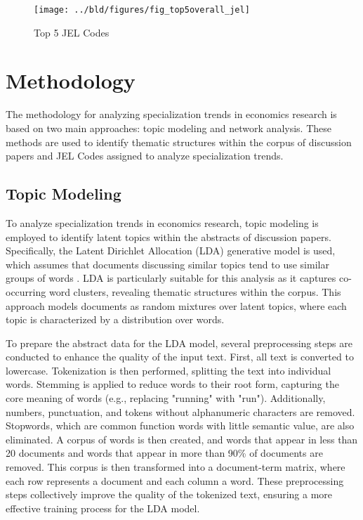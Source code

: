 \documentclass[11pt, a4paper, leqno]{article}
\begin{document}
\begin{figure}[htbp!]
    \centering
    \texttt{[image: ../bld/figures/fig\_top5overall\_jel]}
    \caption{Top 5 JEL Codes}
    \label{fig:top5overall_jel}
\end{figure}

\section{Methodology}
The methodology for analyzing specialization trends in economics research is based on two main approaches: topic modeling and network analysis.
These methods are used to identify thematic structures within the corpus of discussion papers and JEL Codes assigned to analyze specialization trends.

\subsection{Topic Modeling}
To analyze specialization trends in economics research, topic modeling is employed to identify latent topics within the abstracts of discussion papers.
Specifically, the Latent Dirichlet Allocation (LDA) generative model is used, which assumes that documents discussing similar topics tend to use similar groups of words \citep{blei2003}.
LDA is particularly suitable for this analysis as it captures co-occurring word clusters, revealing thematic structures within the corpus.
This approach models documents as random mixtures over latent topics, where each topic is characterized by a distribution over words.

To prepare the abstract data for the LDA model, several preprocessing steps are conducted to enhance the quality of the input text.
First, all text is converted to lowercase.
Tokenization is then performed, splitting the text into individual words.
Stemming is applied to reduce words to their root form, capturing the core meaning of words (e.g., replacing "running" with "run").
Additionally, numbers, punctuation, and tokens without alphanumeric characters are removed.
Stopwords, which are common function words with little semantic value, are also eliminated.
A corpus of words is then created, and words that appear in less than 20 documents and words that appear in more than 90\% of documents are removed.
This corpus is then transformed into a document-term matrix, where each row represents a document and each column a word.
These preprocessing steps collectively improve the quality of the tokenized text, ensuring a more effective training process for the LDA model.
\end{document}

